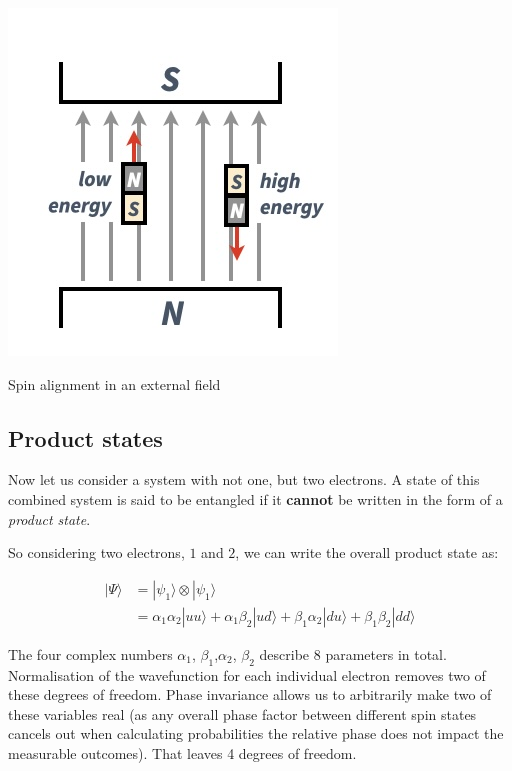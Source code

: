 \documentclass[]{tufte-handout}
\begin{document}
\begin{marginfigure}

{\centering \includegraphics{img/spinsinBfield} 

}

\caption[Spin alignment in an external field]{Spin alignment in an external field}\label{fig:unnamed-chunk-2}
\end{marginfigure}

\hypertarget{product-states}{%
\subsection{Product states}\label{product-states}}

Now let us consider a system with not one, but two electrons. A state of this combined system is said to be entangled if it \textbf{cannot} be written in the form of a \emph{product state}.

So considering two electrons, \(1\) and \(2\), we can write the overall product state as:

\[
\begin{aligned}
|\Psi\rangle &=  |\psi_1\rangle \otimes |\psi_1\rangle \\
&= \alpha_1\alpha_2|uu\rangle + \alpha_1\beta_2 |ud\rangle  + \beta_1\alpha_2 |du\rangle + \beta_1\beta_2 |dd\rangle
\end{aligned} 
\]

The four complex numbers \(\alpha_1\), \(\beta_1\),\(\alpha_2\), \(\beta_2\) describe 8 parameters in total. Normalisation of the wavefunction for each individual electron removes two of these degrees of freedom. Phase invariance allows us to arbitrarily make two of these variables real (as any overall phase factor between different spin states cancels out when calculating probabilities the relative phase does not impact the measurable outcomes). That leaves 4 degrees of freedom.
\end{document}
